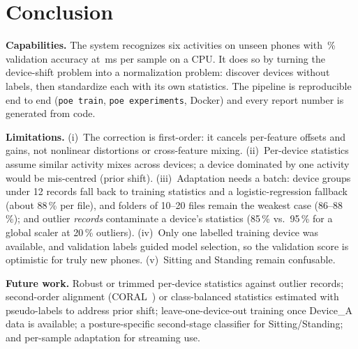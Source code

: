 \section{Conclusion}
\textbf{Capabilities.} The system recognizes six activities on unseen phones with
\FinalAcc\,\% validation accuracy at \FinalMeanMs\,ms per sample on a CPU. It does so by turning
the device-shift problem into a normalization problem: discover devices without labels, then
standardize each with its own statistics. The pipeline is reproducible end to end
(\texttt{poe train}, \texttt{poe experiments}, Docker) and every report number is generated
from code.

\textbf{Limitations.}
(i)~The correction is first-order: it cancels per-feature offsets and gains, not nonlinear
distortions or cross-feature mixing.
(ii)~Per-device statistics assume similar activity mixes across devices; a device dominated by
one activity would be mis-centred (prior shift).
(iii)~Adaptation needs a batch: device groups under 12 records fall back to training statistics
and a logistic-regression fallback (about 88\,\% per file), and folders of 10--20 files remain the
weakest case (86--88\,\%); and outlier \emph{records} contaminate a device's statistics (85\,\% vs.\ 95\,\% for a
global scaler at 20\,\% outliers).
(iv)~Only one labelled training device was available, and validation labels guided model
selection, so the validation score is optimistic for truly new phones.
(v)~Sitting and Standing remain confusable.

\textbf{Future work.} Robust or trimmed per-device statistics against outlier records; second-order alignment (CORAL~\cite{sun2016coral}) or class-balanced
statistics estimated with pseudo-labels to address prior shift; leave-one-device-out
training once Device\_A data is available; a posture-specific second-stage classifier for
Sitting/Standing; and per-sample adaptation for streaming use.
